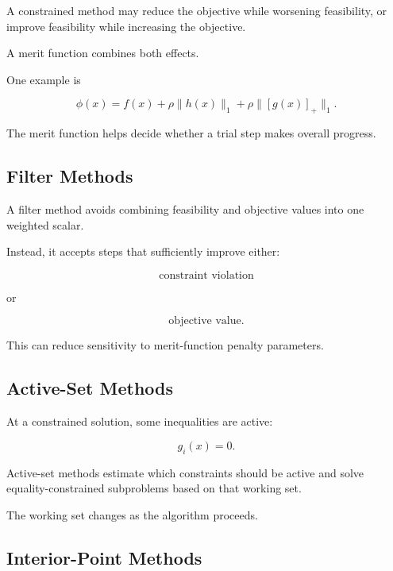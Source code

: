 A constrained method may reduce the objective while worsening feasibility,
or improve feasibility while increasing the objective.

A merit function combines both effects.

One example is

\[
\boxed{
\phi(x)
=
f(x)
+
\rho
\|h(x)\|_1
+
\rho
\|[g(x)]_+\|_1.
}
\]

The merit function helps decide whether a trial step makes overall
progress.

\subsection{Filter Methods}
\label{subsec:optimization-filter-methods}

A filter method avoids combining feasibility and objective values into one
weighted scalar.

Instead, it accepts steps that sufficiently improve either:

\[
\boxed{
\text{constraint violation}
}
\]

or

\[
\boxed{
\text{objective value}.
}
\]

This can reduce sensitivity to merit-function penalty parameters.

\subsection{Active-Set Methods}
\label{subsec:numerical-active-set-methods}

At a constrained solution, some inequalities are active:

\[
\boxed{
g_i(x)=0.
}
\]

Active-set methods estimate which constraints should be active and solve
equality-constrained subproblems based on that working set.

The working set changes as the algorithm proceeds.

\subsection{Interior-Point Methods}
\label{subsec:numerical-interior-point-methods}

